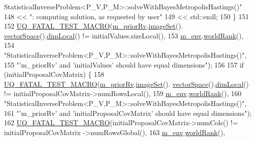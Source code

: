 \begin{DoxyCode}
{       StatisticalInverseProblem<P\_V,P\_M>::solveWithBayesMetropolisHastings()"}
148                             << \textcolor{stringliteral}{": computing solution, as requested by user"}
149                             << std::endl;
150   \}
151 
152   \hyperlink{_defines_8h_a56d63d18d0a6d45757de47fcc06f574d}{UQ\_FATAL\_TEST\_MACRO}(\hyperlink{class_q_u_e_s_o_1_1_statistical_inverse_problem_aebe8ce8eb6fa5f264cafffbe35fbead0}{m\_priorRv}.\hyperlink{class_q_u_e_s_o_1_1_base_vector_r_v_aa4dd2f036228eac1f945bacc7147a922}{imageSet}().
      \hyperlink{class_q_u_e_s_o_1_1_vector_set_a923421590baf5bf93cf066e528f927dc}{vectorSpace}().\hyperlink{class_q_u_e_s_o_1_1_vector_space_a5829a1f4f996f8307c840b705144d666}{dimLocal}() != initialValues.sizeLocal(),
153                       \hyperlink{class_q_u_e_s_o_1_1_statistical_inverse_problem_ac24b3395274db9fad21b13abd2d070d1}{m\_env}.\hyperlink{class_q_u_e_s_o_1_1_base_environment_a78b57112bbd0e6dd0e8afec00b40ffa7}{worldRank}(),
154                       \textcolor{stringliteral}{"StatisticalInverseProblem<P\_V,P\_M>::solveWithBayesMetropolisHastings()"},
155                       \textcolor{stringliteral}{"'m\_priorRv' and 'initialValues' should have equal dimensions"});
156 
157   \textcolor{keywordflow}{if} (initialProposalCovMatrix) \{
158     \hyperlink{_defines_8h_a56d63d18d0a6d45757de47fcc06f574d}{UQ\_FATAL\_TEST\_MACRO}(\hyperlink{class_q_u_e_s_o_1_1_statistical_inverse_problem_aebe8ce8eb6fa5f264cafffbe35fbead0}{m\_priorRv}.\hyperlink{class_q_u_e_s_o_1_1_base_vector_r_v_aa4dd2f036228eac1f945bacc7147a922}{imageSet}().
      \hyperlink{class_q_u_e_s_o_1_1_vector_set_a923421590baf5bf93cf066e528f927dc}{vectorSpace}().\hyperlink{class_q_u_e_s_o_1_1_vector_space_a5829a1f4f996f8307c840b705144d666}{dimLocal}() != initialProposalCovMatrix->numRowsLocal(),
159                         \hyperlink{class_q_u_e_s_o_1_1_statistical_inverse_problem_ac24b3395274db9fad21b13abd2d070d1}{m\_env}.\hyperlink{class_q_u_e_s_o_1_1_base_environment_a78b57112bbd0e6dd0e8afec00b40ffa7}{worldRank}(),
160                         \textcolor{stringliteral}{"StatisticalInverseProblem<P\_V,P\_M>::solveWithBayesMetropolisHastings()"},
161                         \textcolor{stringliteral}{"'m\_priorRv' and 'initialProposalCovMatrix' should have equal dimensions"});
162     \hyperlink{_defines_8h_a56d63d18d0a6d45757de47fcc06f574d}{UQ\_FATAL\_TEST\_MACRO}(initialProposalCovMatrix->numCols() != initialProposalCovMatrix
      ->numRowsGlobal(),
163                         \hyperlink{class_q_u_e_s_o_1_1_statistical_inverse_problem_ac24b3395274db9fad21b13abd2d070d1}{m\_env}.\hyperlink{class_q_u_e_s_o_1_1_base_environment_a78b57112bbd0e6dd0e8afec00b40ffa7}{worldRank}(),

\end{DoxyCode}
